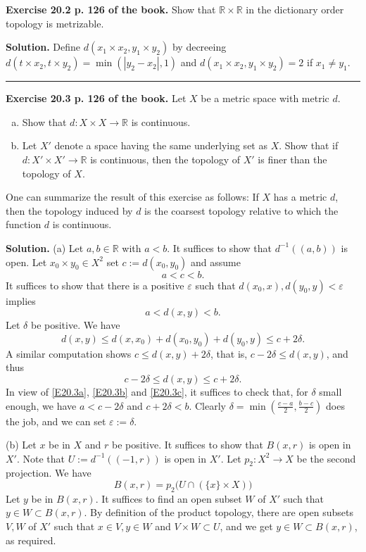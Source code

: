 \documentclass[12pt,letterpaper]{article}
\newcommand{\eps}{\varepsilon}
\newcommand{\noi}{\noindent}%
\newcommand{\R}{\mathbb R}
\begin{document}
\noi\textbf{Exercise 20.2 p. 126 of the book.} Show that $\mathbb{R} \times \mathbb{R}$ in the dictionary order topology is metrizable. 

\noi\textbf{Solution.} Define $d(x_1\times x_2,y_1\times y_2)$ by decreeing $d(t\times x_2,t\times y_2)=\min(|y_2-x_2|,1)$ and $d(x_1\times x_2,y_1\times y_2)=2$ if $x_1\ne y_1$. 

\bigskip\bigskip\hrule\bigskip 

\noi\textbf{Exercise 20.3 p. 126 of the book.} Let $X$ be a metric space with metric $d$.
    \begin{enumerate}[(a)]
        \item Show that $d: X\times X\to\R$ is continuous.
        \item Let $X'$ denote a space having the same underlying set as $X$. Show that if $d: X' \times X' \rightarrow \mathbb{R}$ is continuous, then the topology of $X'$ is finer than the topology of $X$.
    \end{enumerate}

    One can summarize the result of this exercise as follows: If $X$ has a metric $d$, then the topology induced by $d$ is the coarsest topology relative to which the function $d$ is continuous.  

\noi\textbf{Solution.} (a) Let $a,b\in\R$ with $a<b$. It suffices to show that $d^{-1}((a,b))$ is open. Let $x_0\times y_0\in X^2$ set $c:=d(x_0,y_0)$ and assume 
\begin{equation}\label{E20.3a}
a<c<b.
\end{equation}
It suffices to show that there is a positive $\eps$ such that $d(x_0,x),d(y_0,y)<\eps$ implies 
\begin{equation}\label{E20.3b}
a<d(x,y)<b.
\end{equation}
Let $\delta$ be positive. We have 
$$
d(x,y)\le d(x,x_0)+d(x_0,y_0)+d(y_0,y)\le c+2\delta.
$$ 
A similar computation shows $c\le d(x,y)+2\delta$, that is, $c-2\delta\le d(x,y)$, and thus 
\begin{equation}\label{E20.3c}
c-2\delta\le d(x,y)\le c+2\delta.
\end{equation} 
In view of \eqref{E20.3a}, \eqref{E20.3b} and \eqref{E20.3c}, it suffices to check that, for $\delta$ small enough, we have $a<c-2\delta$ and $c+2\delta<b$. Clearly $\delta=\min(\frac{c-a}2,\frac{b-c}2)$ does the job, and we can set $\eps:=\delta$. 

\noi(b) Let $x$ be in $X$ and $r$ be positive. It suffices to show that $B(x,r)$ is open in $X'$. Note that $U:=d^{-1}((-1,r))$ is open in $X'$. Let $p_2:X^2\to X$ be the second projection. We have 
$$
B(x,r)=p_2\big(U\cap(\{x\}\times X)\big)
$$ 
Let $y$ be in $B(x,r)$. It suffices to find an open subset $W$ of $X'$ such that $y\in W\subset B(x,r)$. By definition of the product topology, there are open subsets $V,W$ of $X'$ such that $x\in V,y\in W$ and $V\times W\subset U$, and we get $y\in W\subset B(x,r)$, as required.  
\end{document}
